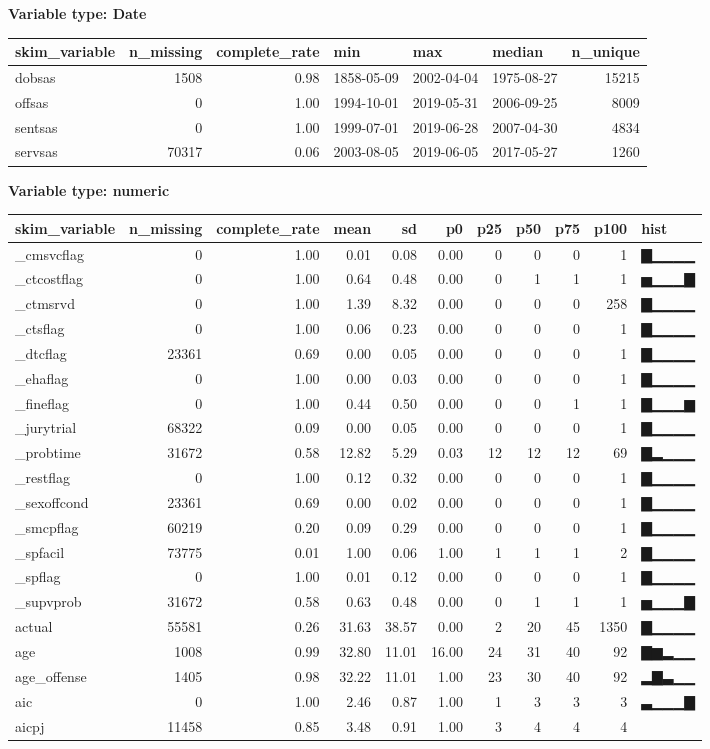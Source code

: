\documentclass[
]{article}
\begin{document}
\textbf{Variable type: Date}

\begin{longtable}[]{@{}lrrlllr@{}}
\toprule
skim\_variable & n\_missing & complete\_rate & min & max & median &
n\_unique\tabularnewline
\midrule
\endhead
dobsas & 1508 & 0.98 & 1858-05-09 & 2002-04-04 & 1975-08-27 &
15215\tabularnewline
offsas & 0 & 1.00 & 1994-10-01 & 2019-05-31 & 2006-09-25 &
8009\tabularnewline
sentsas & 0 & 1.00 & 1999-07-01 & 2019-06-28 & 2007-04-30 &
4834\tabularnewline
servsas & 70317 & 0.06 & 2003-08-05 & 2019-06-05 & 2017-05-27 &
1260\tabularnewline
\bottomrule
\end{longtable}

\textbf{Variable type: numeric}

\begin{longtable}[]{@{}lrrrrrrrrrl@{}}
\toprule
skim\_variable & n\_missing & complete\_rate & mean & sd & p0 & p25 &
p50 & p75 & p100 & hist\tabularnewline
\midrule
\endhead
\_cmsvcflag & 0 & 1.00 & 0.01 & 0.08 & 0.00 & 0 & 0 & 0 & 1 &
▇▁▁▁▁\tabularnewline
\_ctcostflag & 0 & 1.00 & 0.64 & 0.48 & 0.00 & 0 & 1 & 1 & 1 &
▅▁▁▁▇\tabularnewline
\_ctmsrvd & 0 & 1.00 & 1.39 & 8.32 & 0.00 & 0 & 0 & 0 & 258 &
▇▁▁▁▁\tabularnewline
\_ctsflag & 0 & 1.00 & 0.06 & 0.23 & 0.00 & 0 & 0 & 0 & 1 &
▇▁▁▁▁\tabularnewline
\_dtcflag & 23361 & 0.69 & 0.00 & 0.05 & 0.00 & 0 & 0 & 0 & 1 &
▇▁▁▁▁\tabularnewline
\_ehaflag & 0 & 1.00 & 0.00 & 0.03 & 0.00 & 0 & 0 & 0 & 1 &
▇▁▁▁▁\tabularnewline
\_fineflag & 0 & 1.00 & 0.44 & 0.50 & 0.00 & 0 & 0 & 1 & 1 &
▇▁▁▁▆\tabularnewline
\_jurytrial & 68322 & 0.09 & 0.00 & 0.05 & 0.00 & 0 & 0 & 0 & 1 &
▇▁▁▁▁\tabularnewline
\_probtime & 31672 & 0.58 & 12.82 & 5.29 & 0.03 & 12 & 12 & 12 & 69 &
▇▂▁▁▁\tabularnewline
\_restflag & 0 & 1.00 & 0.12 & 0.32 & 0.00 & 0 & 0 & 0 & 1 &
▇▁▁▁▁\tabularnewline
\_sexoffcond & 23361 & 0.69 & 0.00 & 0.02 & 0.00 & 0 & 0 & 0 & 1 &
▇▁▁▁▁\tabularnewline
\_smcpflag & 60219 & 0.20 & 0.09 & 0.29 & 0.00 & 0 & 0 & 0 & 1 &
▇▁▁▁▁\tabularnewline
\_spfacil & 73775 & 0.01 & 1.00 & 0.06 & 1.00 & 1 & 1 & 1 & 2 &
▇▁▁▁▁\tabularnewline
\_spflag & 0 & 1.00 & 0.01 & 0.12 & 0.00 & 0 & 0 & 0 & 1 &
▇▁▁▁▁\tabularnewline
\_supvprob & 31672 & 0.58 & 0.63 & 0.48 & 0.00 & 0 & 1 & 1 & 1 &
▅▁▁▁▇\tabularnewline
actual & 55581 & 0.26 & 31.63 & 38.57 & 0.00 & 2 & 20 & 45 & 1350 &
▇▁▁▁▁\tabularnewline
age & 1008 & 0.99 & 32.80 & 11.01 & 16.00 & 24 & 31 & 40 & 92 &
▇▆▂▁▁\tabularnewline
age\_offense & 1405 & 0.98 & 32.22 & 11.01 & 1.00 & 23 & 30 & 40 & 92 &
▂▇▃▁▁\tabularnewline
aic & 0 & 1.00 & 2.46 & 0.87 & 1.00 & 1 & 3 & 3 & 3 &
▃▁▁▁▇\tabularnewline
aicpj & 11458 & 0.85 & 3.48 & 0.91 & 1.00 & 3 & 4 & 4 & 4 &

\end{longtable}
\end{document}
